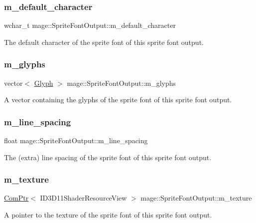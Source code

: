 \subsubsection{\texorpdfstring{m\+\_\+default\+\_\+character}{m\_default\_character}}
{\footnotesize\ttfamily wchar\+\_\+t mage\+::\+Sprite\+Font\+Output\+::m\+\_\+default\+\_\+character}

The default character of the sprite font of this sprite font output. \hypertarget{structmage_1_1_sprite_font_output_aee63c847a919bce662dee371594607dd}{}\label{structmage_1_1_sprite_font_output_aee63c847a919bce662dee371594607dd} 
\subsubsection{\texorpdfstring{m\+\_\+glyphs}{m\_glyphs}}
{\footnotesize\ttfamily vector$<$ \hyperlink{structmage_1_1_glyph}{Glyph} $>$ mage\+::\+Sprite\+Font\+Output\+::m\+\_\+glyphs}

A vector containing the glyphs of the sprite font of this sprite font output. \hypertarget{structmage_1_1_sprite_font_output_adc36a5113ca2473efbc3aa7989606f28}{}\label{structmage_1_1_sprite_font_output_adc36a5113ca2473efbc3aa7989606f28} 
\subsubsection{\texorpdfstring{m\+\_\+line\+\_\+spacing}{m\_line\_spacing}}
{\footnotesize\ttfamily float mage\+::\+Sprite\+Font\+Output\+::m\+\_\+line\+\_\+spacing}

The (extra) line spacing of the sprite font of this sprite font output. \hypertarget{structmage_1_1_sprite_font_output_a3e2f3b44decf05bc81ce91f4bf9ad092}{}\label{structmage_1_1_sprite_font_output_a3e2f3b44decf05bc81ce91f4bf9ad092} 
\subsubsection{\texorpdfstring{m\+\_\+texture}{m\_texture}}
{\footnotesize\ttfamily \hyperlink{namespacemage_ae74f374780900893caa5555d1031fd79}{Com\+Ptr}$<$ I\+D3\+D11\+Shader\+Resource\+View $>$ mage\+::\+Sprite\+Font\+Output\+::m\+\_\+texture}

A pointer to the texture of the sprite font of this sprite font output. 
